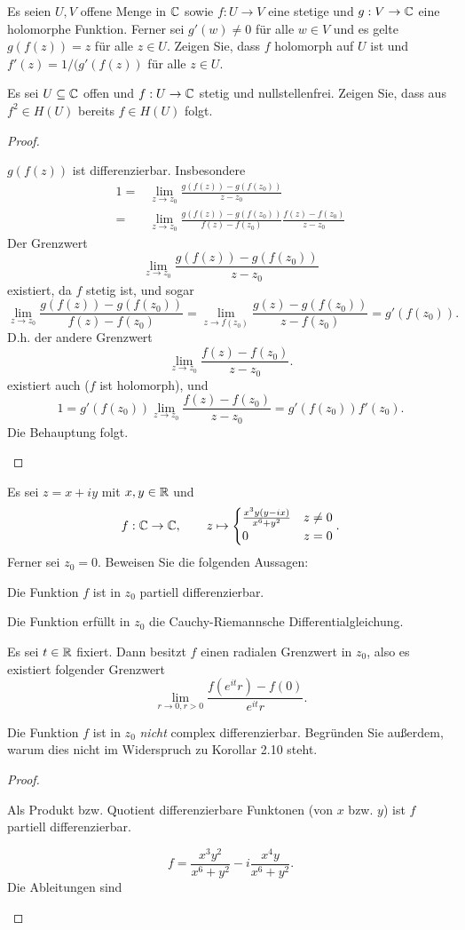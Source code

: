\begin{Problem}
	\begin{parts}
	\item Es seien $U,V$ offene Menge in $\mathbb{C}$ sowie $f:U\to V$ eine stetige und $g:V\to \mathbb{C}$ eine holomorphe Funktion. Ferner sei $g'(w)\neq 0$ f\"{u}r alle $w\in V$ und es gelte $g(f(z))=z$ f\"{u}r alle $z\in U$. Zeigen Sie, dass $f$ holomorph auf $U$ ist und $f'(z)=1 / (g'(f(z))$ f\"{u}r alle $z\in U$.
	\item Es sei $U\subseteq \mathbb{C}$ offen und $f:U\to \mathbb{C}$ stetig und nullstellenfrei. Zeigen Sie, dass aus $f^2\in H(U)$ bereits $f\in H(U)$ folgt.
	\end{parts}
\end{Problem}
\begin{proof}
	\begin{parts}
	\item $g(f(z))$ ist differenzierbar. Insbesondere
		\begin{align*}
			1=&\lim_{z \to z_0} \frac{g(f(z))-g(f(z_0))}{z-z_0}\\
			=&\lim_{z \to z_0} \frac{g(f(z))-g(f(z_0))}{f(z)-f(z_0)}\frac{f(z)-f(z_0)}{z-z_0}
		\end{align*}
		Der Grenzwert
		\[
		\lim_{z \to z_0} \frac{g(f(z))-g(f(z_0))}{z-z_0}
	\]
	existiert, da $f$ stetig ist, und sogar
	\[
		\lim_{z \to z_0} \frac{g(f(z))-g(f(z_0))}{f(z)-f(z_0)}=\lim_{z \to f(z_0)} \frac{g(z)-g(f(z_0))}{z-f(z_0)}=g'(f(z_0))
	.\] 
	D.h. der andere Grenzwert 
\[
\lim_{z \to z_0} \frac{f(z)-f(z_0)}{z-z_0}
.\] 
	existiert auch ($f$ ist holomorph), und
	\[
	1=g'(f(z_0)) \lim_{z \to z_0} \frac{f(z)-f(z_0)}{z-z_0}=g'(f(z_0)) f'(z_0)
	.\]
	Die Behauptung folgt.
\item 
	\end{parts}
\end{proof}
\begin{Problem}
	Es sei $z=x+iy$ mit $x,y\in \mathbb{R}$ und
	\[
	f:\mathbb{C}\to \mathbb{C},\qquad z\mapsto \begin{cases}
		\frac{x^3y(y-ix)}{x^6+y^2} & z\neq 0\\
		0 & z = 0
	\end{cases}
	.\] 
	Ferner sei $z_0=0$. Beweisen Sie die folgenden Aussagen:
	\begin{parts}
	\item Die Funktion $f$ ist in $z_0$ partiell differenzierbar.
	\item Die Funktion erf\"{u}llt in $z_0$ die Cauchy-Riemannsche Differentialgleichung.
	\item Es sei $t\in \mathbb{R}$ fixiert. Dann besitzt $f$ einen radialen Grenzwert in $z_0$, also es existiert folgender Grenzwert
		\[
			\lim_{r \to 0,r>0} \frac{f(e^{it}r)-f(0)}{e^{it}r}
		.\] 
	\item Die Funktion $f$ ist in $z_0$ \emph{nicht} complex differenzierbar. Begr\"{u}nden Sie außerdem, warum dies nicht im Widerspruch zu Korollar 2.10 steht.
	\end{parts}
\end{Problem}
\begin{proof}
	\begin{parts}
	\item Als Produkt bzw. Quotient differenzierbare Funktonen (von $x$ bzw. $y$) ist $f$ partiell differenzierbar.
	\item 
		\[
		f=\frac{x^3 y^2}{x^6 + y^2}-i \frac{x^4 y}{x^6 + y^2}
		.\] 
		Die Ableitungen sind
	\end{parts}
\end{proof}
